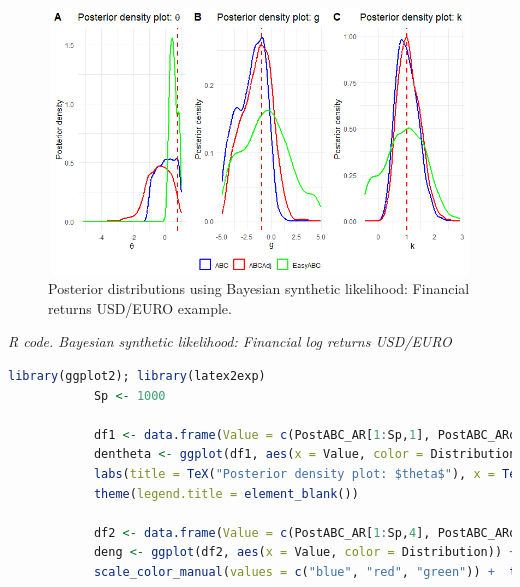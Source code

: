 \begin{enumerate}[leftmargin=*]
\begin{figure}[!h]
	\includegraphics[width=340pt, height=200pt]{Chapters/chapter15/figures/ABCown.png}
	\caption[List of figure caption goes here]{Posterior distributions using Bayesian synthetic likelihood: Financial returns USD/EURO example.}\label{figSBLexcrate}
\end{figure}

\begin{tcolorbox}[enhanced,width=4.67in,center upper,
	fontupper=\large\bfseries,drop shadow southwest,sharp corners]
	\textit{R code. Bayesian synthetic likelihood: Financial log returns USD/EURO}
	\begin{VF}
		\begin{lstlisting}[language=R]
			library(ggplot2); library(latex2exp)
			Sp <- 1000
			
			df1 <- data.frame(Value = c(PostABC_AR[1:Sp,1], PostABC_ARown[1:Sp,1], PostABC_ARownRegAd[1:Sp,1]), Distribution = factor(c(rep("EasyABC", Sp), rep("ABC", Sp), rep("ABCAdj", Sp))))
			dentheta <- ggplot(df1, aes(x = Value, color = Distribution)) + geom_density(linewidth = 1) + geom_vline(xintercept = theta1, linetype = "dashed", color = "red", linewidth = 1) +
			labs(title = TeX("Posterior density plot: $theta$"), x = TeX("$theta$"), y = "Posterior density") + scale_color_manual(values = c("blue", "red", "green")) +  theme_minimal() +
			theme(legend.title = element_blank())
			
			df2 <- data.frame(Value = c(PostABC_AR[1:Sp,4], PostABC_ARown[1:Sp,4], PostABC_ARownRegAd[1:Sp,4]), Distribution = factor(c(rep("EasyABC", Sp), rep("ABC", Sp), rep("ABCAdj", Sp))))
			deng <- ggplot(df2, aes(x = Value, color = Distribution)) +   geom_density(linewidth = 1) + geom_vline(xintercept = g, linetype = "dashed", color = "red", linewidth = 1) + labs(title = TeX("Posterior density plot: g"), x = TeX("$g$"), y = "Posterior density") +
			scale_color_manual(values = c("blue", "red", "green")) +  theme_minimal() + theme(legend.title = element_blank())
			

\end{lstlisting}
\end{VF}
\end{tcolorbox}
\end{enumerate}
